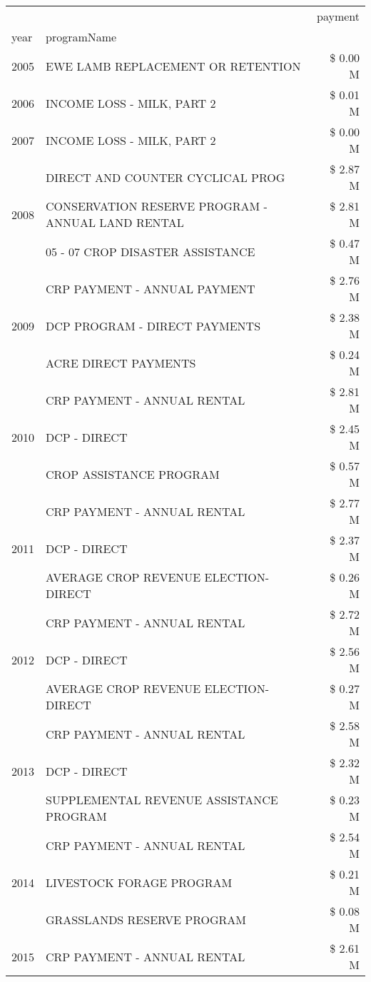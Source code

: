 \begin{tabular}{llr}
\toprule
 &  & payment \\
year & programName &  \\
\midrule
2005 & EWE LAMB REPLACEMENT OR RETENTION & \$ 0.00 M \\
\cline{1-3}
2006 & INCOME LOSS - MILK, PART 2 & \$ 0.01 M \\
\cline{1-3}
2007 & INCOME LOSS - MILK, PART 2 & \$ 0.00 M \\
\cline{1-3}
\multirow[t]{3}{*}{2008} & DIRECT AND COUNTER CYCLICAL PROG & \$ 2.87 M \\
 & CONSERVATION RESERVE PROGRAM - ANNUAL LAND RENTAL & \$ 2.81 M \\
 & 05 - 07 CROP DISASTER ASSISTANCE & \$ 0.47 M \\
\cline{1-3}
\multirow[t]{3}{*}{2009} & CRP PAYMENT - ANNUAL PAYMENT & \$ 2.76 M \\
 & DCP PROGRAM - DIRECT PAYMENTS & \$ 2.38 M \\
 & ACRE DIRECT PAYMENTS & \$ 0.24 M \\
\cline{1-3}
\multirow[t]{3}{*}{2010} & CRP PAYMENT - ANNUAL RENTAL & \$ 2.81 M \\
 & DCP - DIRECT & \$ 2.45 M \\
 & CROP ASSISTANCE PROGRAM & \$ 0.57 M \\
\cline{1-3}
\multirow[t]{3}{*}{2011} & CRP PAYMENT - ANNUAL RENTAL & \$ 2.77 M \\
 & DCP - DIRECT & \$ 2.37 M \\
 & AVERAGE CROP REVENUE ELECTION-DIRECT & \$ 0.26 M \\
\cline{1-3}
\multirow[t]{3}{*}{2012} & CRP PAYMENT - ANNUAL RENTAL & \$ 2.72 M \\
 & DCP - DIRECT & \$ 2.56 M \\
 & AVERAGE CROP REVENUE ELECTION-DIRECT & \$ 0.27 M \\
\cline{1-3}
\multirow[t]{3}{*}{2013} & CRP PAYMENT - ANNUAL RENTAL & \$ 2.58 M \\
 & DCP - DIRECT & \$ 2.32 M \\
 & SUPPLEMENTAL REVENUE ASSISTANCE PROGRAM & \$ 0.23 M \\
\cline{1-3}
\multirow[t]{3}{*}{2014} & CRP PAYMENT - ANNUAL RENTAL & \$ 2.54 M \\
 & LIVESTOCK FORAGE PROGRAM & \$ 0.21 M \\
 & GRASSLANDS RESERVE PROGRAM & \$ 0.08 M \\
\cline{1-3}
\multirow[t]{3}{*}{2015} & CRP PAYMENT - ANNUAL RENTAL & \$ 2.61 M \\

\end{tabular}
